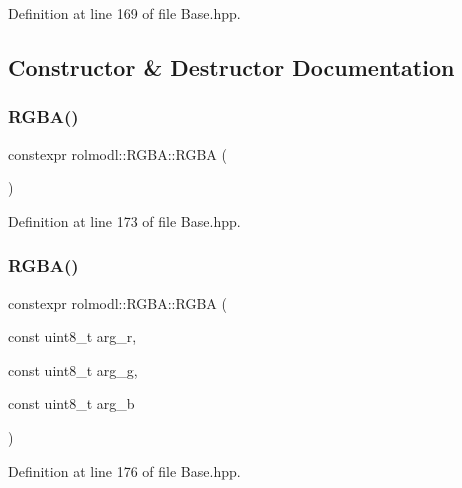Definition at line 169 of file Base.\+hpp.



\subsection{Constructor \& Destructor Documentation}
\mbox{\label{structrolmodl_1_1_r_g_b_a_a1c5b50256730c9573d3e0a3deb6f6bd9}} 
\subsubsection{\texorpdfstring{RGBA()}{RGBA()}\hspace{0.1cm}{\footnotesize\ttfamily [1/3]}}
{\footnotesize\ttfamily constexpr rolmodl\+::\+R\+G\+B\+A\+::\+R\+G\+BA (\begin{DoxyParamCaption}{ }\end{DoxyParamCaption})\hspace{0.3cm}{\ttfamily [inline]}}



Definition at line 173 of file Base.\+hpp.

\mbox{\label{structrolmodl_1_1_r_g_b_a_aff6e831cd7ef85dccb5a56dde36b835e}} 
\subsubsection{\texorpdfstring{RGBA()}{RGBA()}\hspace{0.1cm}{\footnotesize\ttfamily [2/3]}}
{\footnotesize\ttfamily constexpr rolmodl\+::\+R\+G\+B\+A\+::\+R\+G\+BA (\begin{DoxyParamCaption}\item[{const uint8\+\_\+t}]{arg\+\_\+r,  }\item[{const uint8\+\_\+t}]{arg\+\_\+g,  }\item[{const uint8\+\_\+t}]{arg\+\_\+b }\end{DoxyParamCaption})\hspace{0.3cm}{\ttfamily [inline]}}



Definition at line 176 of file Base.\+hpp.

\mbox{\label{structrolmodl_1_1_r_g_b_a_adda91fdd4ee346dcc19019c2ebdcf325}} 
